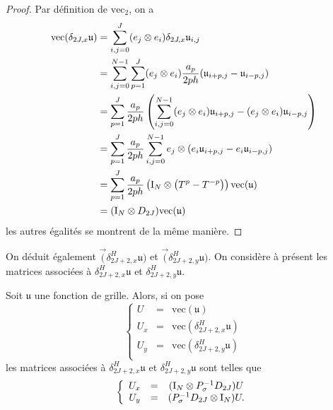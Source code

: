 \begin{proof}
Par définition de $\text{vec}_2$, on a 
\begin{align*}
\text{vec} (\delta_{2J,x} \mathfrak{u}) & = \displaystyle\sum\limits_{i,j=0}^J (e_j \otimes e_i) \delta_{2J,x} \mathfrak{u}_{i,j} \\
	& = \displaystyle\sum\limits_{i,j=0}^{N-1} \displaystyle\sum\limits_{p=1}^J (e_j \otimes e_i) \dfrac{a_p}{2ph} (\mathfrak{u}_{i+p,j} - \mathfrak{u}_{i-p,j}) \\
	& = \displaystyle\sum\limits_{p=1}^J \dfrac{a_p}{2ph} \left( \displaystyle\sum\limits_{i,j=0}^{N-1} (e_j \otimes e_i) \mathfrak{u}_{i+p,j} - (e_j \otimes e_i) \mathfrak{u}_{i-p,j} \right) \\
	& = \displaystyle\sum\limits_{p=1}^J \dfrac{a_p}{2ph} \displaystyle\sum\limits_{i,j=0}^{N-1} e_j \otimes (e_i \mathfrak{u}_{i+p,j} - e_i\mathfrak{u}_{i-p,j})\\
	& = \displaystyle\sum\limits_{p=1}^J \dfrac{a_p}{2ph} \left( \text{I}_N \otimes \left( T^p - T^{-p}  \right) \right) \text{vec} (\mathfrak{u}) \\
	& = (\text{I}_N \otimes D_{2J}) \text{vec} (\mathfrak{u})
\end{align*}
les autres égalités se montrent de la même manière.
\end{proof}
On déduit également $\vec(\delta_{2J+2,x}^H \mathfrak{u})$ et $\vec(\delta_{2J+2,y}^H \mathfrak{u})$.
On considère à présent les matrices associées à $\delta^H_{2J+2,x} \mathfrak{u}$ et $\delta^H_{2J+2,y} \mathfrak{u}$.
\begin{theoreme}
Soit $\mathfrak{u}$ une fonction de grille. Alors, si on pose 
\begin{equation}
\left\lbrace
\begin{array}{rcl}
U & = & \text{vec} (\mathfrak{u}) \\
U_x & = & \text{vec} (\delta_{2J+2,x}^H \mathfrak{u}) \\
U_y & = & \text{vec} (\delta_{2J+2,y}^H \mathfrak{u}) \\
\end{array}
\right.
\end{equation}
les matrices associées à $\delta^H_{2J+2,x} \mathfrak{u}$ et $\delta^H_{2J+2,y} \mathfrak{u}$ sont telles que 
\begin{equation}
\left\lbrace
\begin{array}{rcccl}
U_x &=& (\text{I}_N \otimes P^{-1}_{\sigma} D_{2J})U \\
U_y &=& (P^{-1}_{\sigma}D_{2J} \otimes \text{I}_N)U.
\end{array}
\right.
\end{equation}
\end{theoreme}

